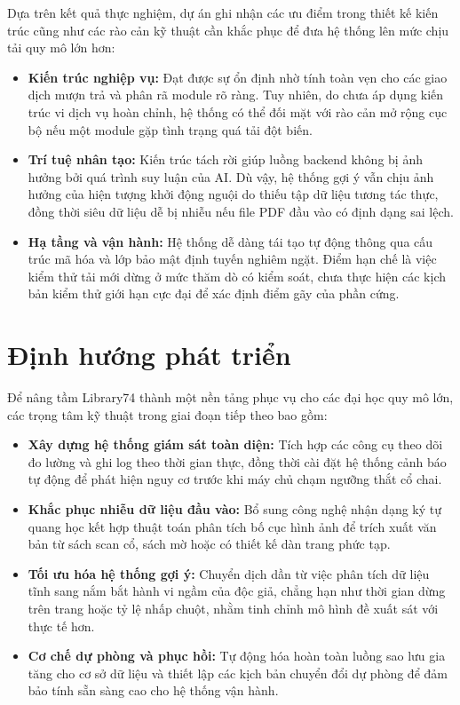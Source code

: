 Dựa trên kết quả thực nghiệm, dự án ghi nhận các ưu điểm trong thiết kế kiến trúc cũng như các rào cản kỹ thuật cần khắc phục để đưa hệ thống lên mức chịu tải quy mô lớn hơn:

\begin{itemize}
    \item \textbf{Kiến trúc nghiệp vụ:} Đạt được sự ổn định nhờ tính toàn vẹn cho các giao dịch mượn trả và phân rã module rõ ràng. Tuy nhiên, do chưa áp dụng kiến trúc vi dịch vụ hoàn chỉnh, hệ thống có thể đối mặt với rào cản mở rộng cục bộ nếu một module gặp tình trạng quá tải đột biến.
    \item \textbf{Trí tuệ nhân tạo:} Kiến trúc tách rời giúp luồng backend không bị ảnh hưởng bởi quá trình suy luận của AI. Dù vậy, hệ thống gợi ý vẫn chịu ảnh hưởng của hiện tượng khởi động nguội do thiếu tập dữ liệu tương tác thực, đồng thời siêu dữ liệu dễ bị nhiễu nếu file PDF đầu vào có định dạng sai lệch.
    \item \textbf{Hạ tầng và vận hành:} Hệ thống dễ dàng tái tạo tự động thông qua cấu trúc mã hóa và lớp bảo mật định tuyến nghiêm ngặt. Điểm hạn chế là việc kiểm thử tải mới dừng ở mức thăm dò có kiểm soát, chưa thực hiện các kịch bản kiểm thử giới hạn cực đại để xác định điểm gãy của phần cứng.
\end{itemize}

\section{Định hướng phát triển}

Để nâng tầm Library74 thành một nền tảng phục vụ cho các đại học quy mô lớn, các trọng tâm kỹ thuật trong giai đoạn tiếp theo bao gồm:

\begin{itemize}
    \item \textbf{Xây dựng hệ thống giám sát toàn diện:} Tích hợp các công cụ theo dõi đo lường và ghi log theo thời gian thực, đồng thời cài đặt hệ thống cảnh báo tự động để phát hiện nguy cơ trước khi máy chủ chạm ngưỡng thắt cổ chai.
    \item \textbf{Khắc phục nhiễu dữ liệu đầu vào:} Bổ sung công nghệ nhận dạng ký tự quang học kết hợp thuật toán phân tích bố cục hình ảnh để trích xuất văn bản từ sách scan cổ, sách mờ hoặc có thiết kế dàn trang phức tạp.
    \item \textbf{Tối ưu hóa hệ thống gợi ý:} Chuyển dịch dần từ việc phân tích dữ liệu tĩnh sang nắm bắt hành vi ngầm của độc giả, chẳng hạn như thời gian dừng trên trang hoặc tỷ lệ nhấp chuột, nhằm tinh chỉnh mô hình đề xuất sát với thực tế hơn.
    \item \textbf{Cơ chế dự phòng và phục hồi:} Tự động hóa hoàn toàn luồng sao lưu gia tăng cho cơ sở dữ liệu và thiết lập các kịch bản chuyển đổi dự phòng để đảm bảo tính sẵn sàng cao cho hệ thống vận hành.
\end{itemize}

